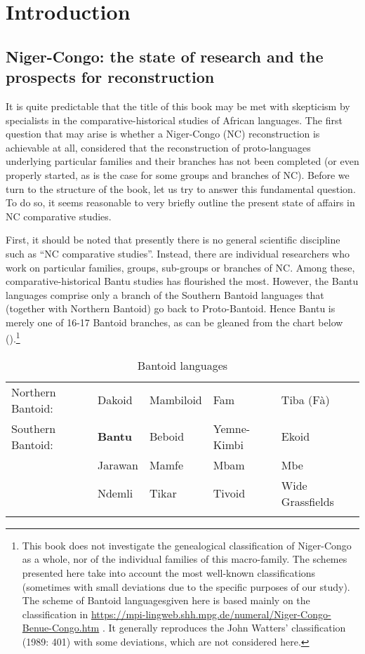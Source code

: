 \section{Introduction}
\subsection{Niger-Congo: the state of research and the prospects for reconstruction} 

It is quite predictable that the title of this book may be met with skepticism by specialists in the comparative-historical studies of African languages. The first question that may arise is whether a Niger-Congo (NC) reconstruction is achievable at all, considered that the reconstruction of proto-languages underlying particular families and their branches has not been completed (or even properly started, as is the case for some groups and branches of NC). Before we turn to the structure of the book, let us try to answer this fundamental question. To do so, it seems reasonable to very briefly outline the present state of affairs in NC comparative studies. 

First, it should be noted that presently there is no general scientific discipline such as “NC comparative studies”. Instead, there are individual researchers who work on particular families, groups, sub-groups or branches of NC. Among these, comparative-historical Bantu studies has flourished the most. However, the Bantu languages comprise only a branch of the Southern Bantoid languages that (together with Northern Bantoid) go back to Proto-Bantoid. Hence Bantu is merely one of 16-17 Bantoid branches, as can be gleaned from the chart below ().\footnote{This book does not investigate the genealogical classification of Niger-Congo as a whole, nor of the individual families of this macro-family. The schemes presented here take into account the most well-known classifications (sometimes with small deviations due to the specific purposes of our study). The scheme of Bantoid languages ​​given here is based mainly on the classification in \url{https://mpi-lingweb.shh.mpg.de/numeral/Niger-Congo-Benue-Congo.htm} . It generally reproduces the John Watters' classification (1989: 401) with some deviations, which are not considered here.}

 
\begin{table}
\caption{Bantoid languages}


\label{tab:0.1}
\begin{tabularx}{\textwidth}{Qllll}
\lsptoprule
{}
Northern Bantoid: & Dakoid & Mambiloid & Fam & Tiba (F{\`{a}})\\
Southern Bantoid: & \textbf{Bantu} & Beboid & Yemne-Kimbi & Ekoid\\
~ & Jarawan & Mamfe & Mbam & Mbe\\
~ & Ndemli & Tikar & Tivoid & Wide Grassfields\\
\lspbottomrule
\end{tabularx}
\end{table}

